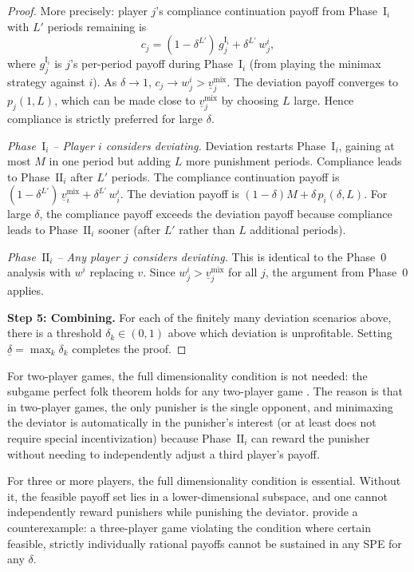 \documentclass[11pt,a4paper]{article}
\begin{document}
\begin{proof}
More precisely: player $j$'s compliance continuation payoff from
Phase~$\mathrm{I}_i$ with $L'$ periods remaining is
\[
    c_j = (1 - \delta^{L'})\, g_j^{\mathrm{I}_i} + \delta^{L'}\, w^i_j,
\]
where $g_j^{\mathrm{I}_i}$ is $j$'s per-period payoff during
Phase~$\mathrm{I}_i$ (from playing the minimax strategy against $i$).
As $\delta \to 1$, $c_j \to w^i_j >
\underline{v}_j^{\mathrm{mix}}$. The deviation payoff converges to
$p_j(1, L)$, which can be made close to
$\underline{v}_j^{\mathrm{mix}}$ by choosing $L$ large. Hence
compliance is strictly preferred for large $\delta$.

\emph{Phase~$\mathrm{I}_i$ -- Player $i$ considers deviating.}
Deviation restarts Phase~$\mathrm{I}_i$, gaining at most $M$ in one
period but adding $L$ more punishment periods. Compliance leads to
Phase~$\mathrm{II}_i$ after $L'$ periods. The compliance continuation
payoff is $(1 - \delta^{L'})\,\underline{v}_i^{\mathrm{mix}} +
\delta^{L'}\, w^i_i$. The deviation payoff is
$(1-\delta)M + \delta\, p_i(\delta, L)$. For large $\delta$, the
compliance payoff exceeds the deviation payoff because compliance
leads to Phase~$\mathrm{II}_i$ sooner (after $L'$ rather than $L$
additional periods).

\emph{Phase~$\mathrm{II}_i$ -- Any player $j$ considers deviating.}
This is identical to the Phase~0 analysis with $w^i$ replacing $v$. Since
$w^i_j > \underline{v}_j^{\mathrm{mix}}$ for all $j$, the argument from
Phase~0 applies.

\textbf{Step 5: Combining.}
For each of the finitely many deviation scenarios above, there is a
threshold $\delta_k \in (0,1)$ above which deviation is unprofitable.
Setting $\underline{\delta} = \max_k \delta_k$ completes the proof.
\end{proof}

\begin{remark}
For two-player games, the full dimensionality condition is not needed: the
subgame perfect folk theorem holds for any two-player game
\citep{fudenberg1986}. The reason is that in two-player games, the only
punisher is the single opponent, and minimaxing the deviator is
automatically in the punisher's interest (or at least does not require
special incentivization) because Phase~$\mathrm{II}_i$ can reward the
punisher without needing to independently adjust a third player's payoff.
\end{remark}

\begin{remark}
\label{rem:full-dim-necessity}
For three or more players, the full dimensionality condition is essential.
Without it, the feasible payoff set lies in a lower-dimensional subspace,
and one cannot independently reward punishers while punishing the deviator.
\citet{fudenberg1986} provide a counterexample: a three-player game
violating the condition where certain feasible, strictly individually
rational payoffs cannot be sustained in any SPE for any $\delta$.
\end{remark}
\end{document}
